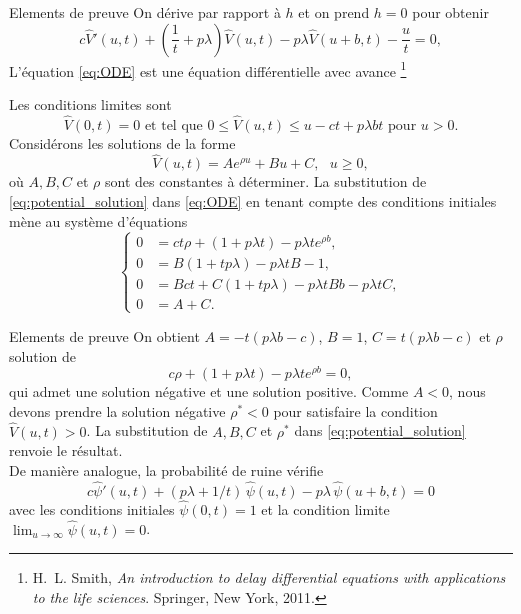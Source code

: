 \documentclass{beamer}
\newcommand\blfootnote[1]{%
  \begingroup
  \renewcommand\thefootnote{}\footnote{#1}%
  \addtocounter{footnote}{-1}%
  \endgroup
}
\begin{document}
\begin{frame}{Elements de preuve}
\scriptsize
On dérive par rapport à $h$ et on prend $h=0$ pour obtenir
\begin{equation}\label{eq:ODE}
c\widehat{V}'(u,t) + \left(\frac{1}{t} +  p\lambda\right)\widehat{V}(u,t) - p\lambda \widehat{V}(u+b,t) - \frac{u}{t} =0,
\end{equation}
L'équation \eqref{eq:ODE} est une équation différentielle avec avance
\blfootnote{\tiny 
 H.~L. Smith, {\em An introduction to delay differential equations with
  applications to the life sciences}.
\newblock Springer, New York, 2011.
}
Les conditions limites sont
$$
\widehat{V}(0,t) = 0 \text{ et tel que } 0\leq \widehat{V}(u,t)\leq u-ct+p\lambda b t \text{ pour }u>0.
$$  
Considérons les solutions de la forme 
\begin{equation}\label{eq:potential_solution}
\widehat{V}(u,t) = Ae^{\rho u }+Bu + C,\text{ }u \ge 0, 
\end{equation}
où $A, B,C$ et $\rho$ sont des constantes à déterminer. La substitution de  \eqref{eq:potential_solution} dans \eqref{eq:ODE} en tenant compte des conditions initiales mène au système d'équations
\begin{equation*}
\begin{cases}
0&=ct\rho + \left(1+p\lambda t\right)-p\lambda te^{\rho b}, \\
0&= B\left(1+tp\lambda\right)-p\lambda tB - 1,\\
0&=Bct+C(1+tp\lambda) - p\lambda t Bb-p\lambda tC, \\
0&=A+C.
\end{cases}
\end{equation*}
\end{frame}
\begin{frame}{Elements de preuve}
\scriptsize
On obtient $A = -t(p\lambda b - c)$, $B = 1$, $C = t(p\lambda b - c)$ et $\rho$ solution de
$$
c\rho + \left(1+p\lambda t\right)-p\lambda te^{\rho b} = 0,
$$
qui admet une solution négative et une solution positive. Comme $A<0$, nous devons prendre la solution négative  $\rho^\ast<0$ pour satisfaire la condition $\widehat{V}(u,t)>0$. La substitution de $A,B,C$ et $\rho^{\ast}$ dans \eqref{eq:potential_solution} renvoie le résultat.\\

De manière analogue, la probabilité de ruine vérifie 
\begin{equation*}\label{psii}
c\widehat{\psi}'(u,t)+(p \lambda+1/t)\,\widehat{\psi}(u,t)-p \lambda\,\widehat{\psi}(u+b,t)=0
\end{equation*}
avec les conditions initiales $\widehat{\psi}(0,t)=1$ et la condition limite $\lim_{u\to\infty}\widehat{\psi}(u,t)=0$.
\end{frame}
\end{document}
